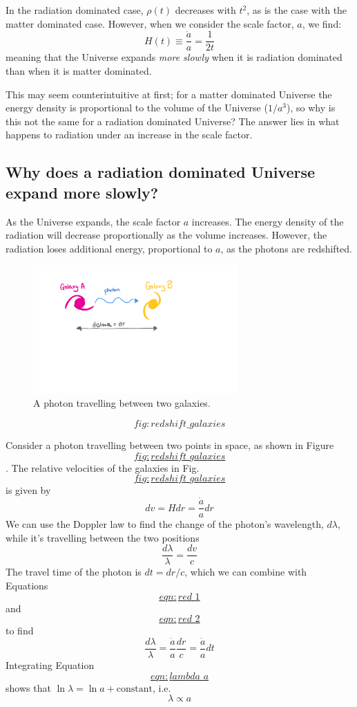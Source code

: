 \documentclass[]{book}
\begin{document}
In the radiation dominated case, \(\rho(t)\) decreases with \(t^2\), as
is the case with the matter dominated case. However, when we consider
the scale factor, \(a\), we find:
\[H(t) \equiv \dfrac{\dot{a}}{a} = \dfrac{1}{2t}\] meaning that the
Universe expands \emph{more slowly} when it is radiation dominated than
when it is matter dominated.

This may seem counterintuitive at first; for a matter dominated Universe
the energy density is proportional to the volume of the Universe
(\(1/a^3\)), so why is this not the same for a radiation dominated
Universe? The answer lies in what happens to radiation under an increase
in the scale factor.

\subsection{Why does a radiation dominated Universe expand more
slowly?}\label{sec:slow_expansion_rad}

As the Universe expands, the scale factor \(a\) increases. The energy
density of the radiation will decrease proportionally as the volume
increases. However, the radiation loses additional energy, proportional
to \(a\), as the photons are redshifted.

\begin{figure}
\centering
\includegraphics[width=0.70000\textwidth]{Images/redshift_galaxies.pdf}
\caption{A photon travelling between two galaxies.}
\end{figure}

\protect\hypertarget{fig:redshift_galaxies}{}{\[fig:redshift\_galaxies\]}

Consider a photon travelling between two points in space, as shown in
Figure~\protect\hyperlink{fig:redshift_galaxies}{\[fig:redshift\_galaxies\]}.
The relative velocities of the galaxies in
Fig.~\protect\hyperlink{fig:redshift_galaxies}{\[fig:redshift\_galaxies\]}
is given by \[\label{eqn:red_1}
    dv = H dr = \dfrac{\dot{a}}{a} dr\] We can use the Doppler law to
find the change of the photon's wavelength, \(d\lambda\), while it's
travelling between the two positions \[\label{eqn:red_2}
    \dfrac{d\lambda}{\lambda} = \dfrac{dv}{c}\] The travel time of the
photon is \(dt = dr/c\), which we can combine with
Equations~\protect\hyperlink{eqn:red_1}{\[eqn:red\_1\]} and
\protect\hyperlink{eqn:red_2}{\[eqn:red\_2\]} to find
\[\label{eqn:lambda_a}
    \dfrac{d\lambda}{\lambda} = \dfrac{\dot{a}}{a} \dfrac{dr}{c} = \dfrac{\dot{a}}{a} dt\]
Integrating Equation~\protect\hyperlink{eqn:lambda_a}{\[eqn:lambda\_a\]}
shows that \(\ln \lambda = \ln a + \text{constant}\), i.e.
\[\lambda \propto a\]
\end{document}
